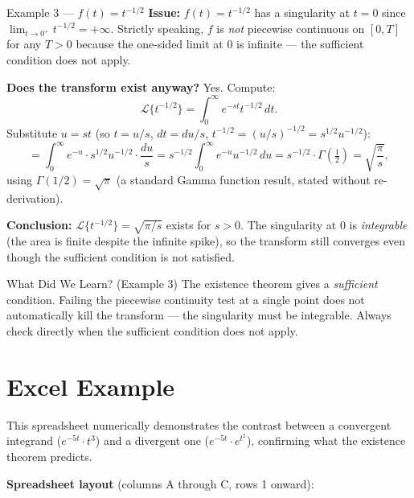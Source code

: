 \documentclass[12pt,a4paper]{article}
\begin{document}
\begin{infobox}{Example 3 --- $f(t) = t^{-1/2}$}
\textbf{Issue:} $f(t) = t^{-1/2}$ has a singularity at $t = 0$ since
$\lim_{t \to 0^+} t^{-1/2} = +\infty$.
Strictly speaking, $f$ is \emph{not} piecewise continuous on $[0, T]$ for any $T > 0$
because the one-sided limit at $0$ is infinite --- the sufficient condition does not apply.

\medskip
\textbf{Does the transform exist anyway?}
Yes. Compute:
\[
  \mathcal{L}\{t^{-1/2}\} = \int_0^\infty e^{-st} t^{-1/2}\, dt.
\]
Substitute $u = st$ (so $t = u/s$, $dt = du/s$, $t^{-1/2} = (u/s)^{-1/2} = s^{1/2} u^{-1/2}$):
\[
  = \int_0^\infty e^{-u} \cdot s^{1/2} u^{-1/2} \cdot \frac{du}{s}
  = s^{-1/2} \int_0^\infty e^{-u} u^{-1/2}\, du
  = s^{-1/2} \cdot \Gamma\!\left(\tfrac{1}{2}\right)
  = \sqrt{\frac{\pi}{s}},
\]
using $\Gamma(1/2) = \sqrt{\pi}$ (a standard Gamma function result, stated without re-derivation).

\medskip
\textbf{Conclusion:} $\mathcal{L}\{t^{-1/2}\} = \sqrt{\pi/s}$ exists for $s > 0$.
The singularity at $0$ is \emph{integrable} (the area is finite despite the infinite spike),
so the transform still converges even though the sufficient condition is not satisfied.
\end{infobox}

\begin{learnbox}{What Did We Learn? (Example 3)}
The existence theorem gives a \emph{sufficient} condition.
Failing the piecewise continuity test at a single point does not automatically kill the
transform --- the singularity must be integrable.
Always check directly when the sufficient condition does not apply.
\end{learnbox}

\section{Excel Example}

This spreadsheet numerically demonstrates the contrast between a convergent integrand
($e^{-5t} \cdot t^3$) and a divergent one ($e^{-5t} \cdot e^{t^2}$), confirming what the
existence theorem predicts.

\medskip
\noindent\textbf{Spreadsheet layout} (columns A through C, rows 1 onward):
\end{document}
